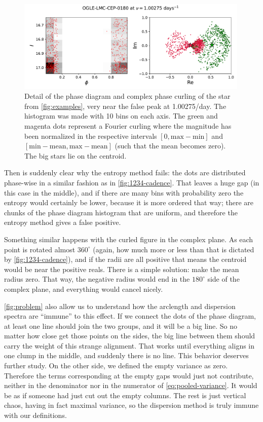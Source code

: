 \begin{figure}
	\centering
	\includegraphics[width=0.99\textwidth]{img/alias.pdf}
	\caption[Detail of the failure mode of Fourier and entropy methods]{
		Detail of the phase diagram and complex phase curling of the star from \autoref{fig:examples}, very near the false peak at 1.00275/day.
		The histogram was made with 10 bins on each axis.
		The green and magenta dots represent a Fourier curling where the magnitude has been normalized in the respective intervals 
		$[0,\text{max}-\text{min}]$ and $[\text{min}-\text{mean},\text{max}-\text{mean}]$ (such that the mean becomes zero).
		The big stars lie on the centroid.
	}
	\label{fig:problem}
\end{figure}

Then is suddenly clear why the entropy method fails: the dots are distributed phase-wise in a similar fashion as in \autoref{fig:1234-cadence}.
That leaves a huge gap (in this case in the middle), and if there are many bins with probability zero the entropy would certainly be lower,
because it is more ordered that way; there are chunks of the phase diagram histogram that are uniform, and therefore the entropy method gives a false positive.

Something similar happens with the curled figure in the complex plane. As each point is rotated almost $360^\circ$ 
(again, how much more or less than that is dictated by \autoref{fig:1234-cadence}), and if the radii are all positive that means the centroid would be near the positive reals.
There is a simple solution: make the mean radius zero. That way, the negative radius would end in the $180^\circ$ side of the complex plane, and everything would cancel nicely.

\autoref{fig:problem} also allow us to understand how the arclength and dispersion spectra are \enquote{immune} to this effect. 
If we connect the dots of the phase diagram,  at least one line should join the two groups, and it will be a big line.
So no matter how close get those points on the sides, the big line between them should carry the weight of this strange alignment.
That works until everything aligns in one clump in the middle, and suddenly there is no line. This behavior deserves further study.
On the other side, we defined the empty variance as zero. 
Therefore the terms corresponding at the empty gaps would just not contribute, neither in the denominator nor in the numerator of \autoref{eq:pooled-variance}.
It would be as if someone had just cut out the empty columns. The rest is just vertical chaos, having in fact maximal variance,
so the dispersion method is truly immune with our definitions.
 







